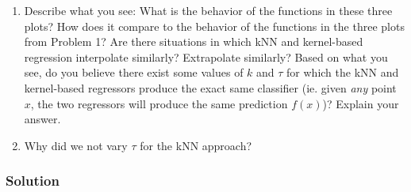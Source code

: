 \documentclass[submit]{harvardml}
\begin{document}
\begin{problem}
\begin{enumerate}
\item Describe what you see: What is the behavior of the functions in
  these three plots?  How does it compare to the behavior of the
  functions in the three plots from Problem 1?  Are there situations
  in which kNN and kernel-based regression interpolate similarly?
  Extrapolate similarly?  Based on what you see, do you believe there
  exist some values of $k$ and $\tau$ for which the kNN and kernel-based regressors produce the exact same classifier (ie. given \textit{any} point $x$, the two regressors will produce the same prediction $f(x)$)? Explain your answer.
  
\item Why did we not vary $\tau$ for the kNN approach?

\end{enumerate}

\end{problem}

\newpage
\subsubsection*{Solution}
\end{document}
